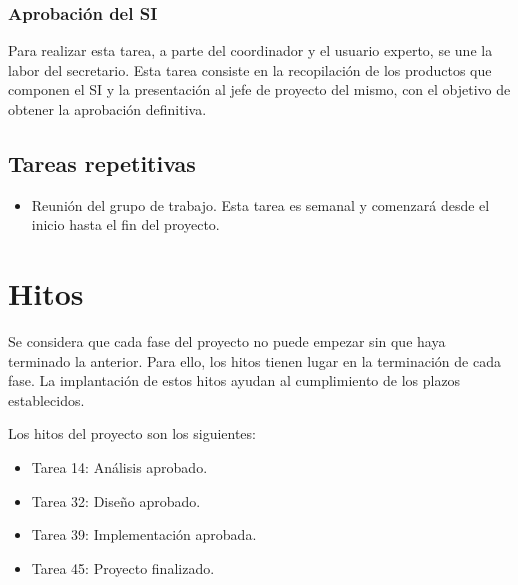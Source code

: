 \documentclass[11pt,a4paper,spanish,twoside]{book}
\begin{document}
\subsubsection{Aprobación del SI}
Para realizar esta tarea, a parte del coordinador y el usuario experto, se une 
la labor del secretario. Esta tarea consiste en la recopilación de los 
productos que componen el SI y la presentación al jefe de proyecto del mismo, 
con el objetivo de obtener la aprobación definitiva.

\subsection{Tareas repetitivas}
  \begin{itemize}
  \item Reunión del grupo de trabajo. Esta tarea es semanal y comenzará desde
    el inicio hasta el fin del proyecto.
  \end{itemize}

\section{Hitos}
Se considera que cada fase del proyecto no puede empezar sin que haya
terminado la anterior. Para ello, los hitos tienen lugar en la terminación de
cada fase. La implantación de estos hitos ayudan al cumplimiento de los
plazos establecidos.

Los hitos del proyecto son los siguientes:
\begin{itemize}
\item Tarea 14: Análisis aprobado.
\item Tarea 32: Diseño aprobado.
\item Tarea 39: Implementación aprobada.
\item Tarea 45: Proyecto finalizado.
\end{itemize}
\end{document}
